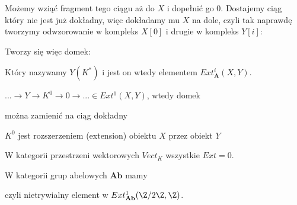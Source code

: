 Możemy wziąć fragment tego ciągu aż do $X$ i dopełnić go $0$. Dostajemy ciąg który nie jest już dokładny, więc dokładamy mu $X$ na dole, czyli tak naprawdę tworzymy odwzorowanie w kompleks $X[0]$ i drugie w kompleks $Y[i]$:
\begin{center}\end{center}
Tworzy się więc domek:
\begin{center}\end{center}
Który nazywamy $Y(K^*)$ i jest on wtedy elementem $Ext_{\mathbf{A}}^i(X, Y)$.

\begin{example}
  \item $...\to Y\to K^0\to 0\to ... \in Ext^1(X, Y)$, wtedy domek 
    \begin{center}\end{center}
    można zamienić na ciąg dokładny
    \begin{center}\end{center}
    $K^0$ jest rozszerzeniem (extension) obiektu $X$ przez obiekt $Y$
  \item W kategorii przestrzeni wektorowych $Vect_K$ wszystkie $Ext=0$.
  \item W kategorii grup abelowych $\mathbf{Ab}$ mamy 
    \begin{center}\end{center}
    czyli nietrywialny element w $Ext^1_{\mathbf{Ab}}(\Z/2\Z, \Z)$.
\end{example}

